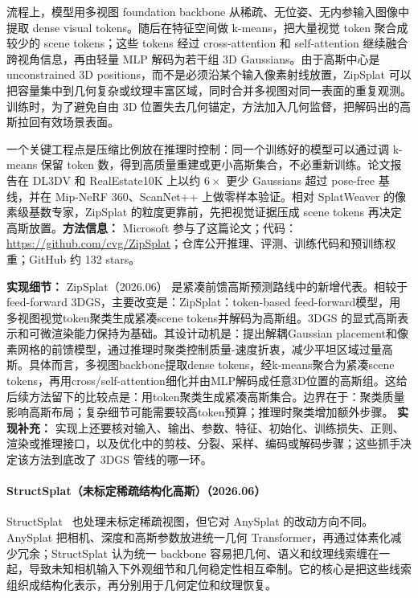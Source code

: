流程上，模型用多视图 foundation backbone 从稀疏、无位姿、无内参输入图像中提取 dense visual tokens。随后在特征空间做 k-means，把大量视觉 token 聚合成较少的 scene tokens；这些 tokens 经过 cross-attention 和 self-attention 继续融合跨视角信息，再由轻量 MLP 解码为若干组 3D Gaussians。由于高斯中心是 unconstrained 3D positions，而不是必须沿某个输入像素射线放置，ZipSplat 可以把容量集中到几何复杂或纹理丰富区域，同时合并多视图对同一表面的重复观测。训练时，为了避免自由 3D 位置失去几何锚定，方法加入几何监督，把解码出的高斯拉回有效场景表面。

一个关键工程点是压缩比例放在推理时控制：同一个训练好的模型可以通过调 k-means 保留 token 数，得到高质量重建或更小高斯集合，不必重新训练。论文报告在 DL3DV 和 RealEstate10K 上以约 $6\times$ 更少 Gaussians 超过 pose-free 基线，并在 Mip-NeRF 360、ScanNet++ 上做零样本验证。相对 SplatWeaver 的像素级基数专家，ZipSplat 的粒度更靠前，先把视觉证据压成 scene tokens 再决定高斯放置。\textbf{方法信息：} Microsoft 参与了这篇论文；代码：\url{https://github.com/cvg/ZipSplat}；仓库公开推理、评测、训练代码和预训练权重；GitHub 约 132 stars。

\textbf{实现细节：} ZipSplat（2026.06） 是紧凑前馈高斯预测路线中的新增代表。相较于 feed-forward 3DGS，主要改变是：ZipSplat：token-based feed-forward模型，用多视图视觉token聚类生成紧凑scene tokens并解码为高斯组。3DGS 的显式高斯表示和可微渲染能力保持为基础。其设计动机是：提出解耦Gaussian placement和像素网格的前馈模型，通过推理时聚类控制质量-速度折衷，减少平坦区域过量高斯。具体而言，多视图backbone提取dense tokens，经k-means聚合为紧凑scene tokens，再用cross/self-attention细化并由MLP解码成任意3D位置的高斯组。这给后续方法留下的比较点是：用token聚类生成紧凑高斯集合。边界在于：聚类质量影响高斯布局；复杂细节可能需要较高token预算；推理时聚类增加额外步骤。
\textbf{实现补充：} 实现上还要核对输入、输出、参数、特征、初始化、训练损失、正则、渲染或推理接口，以及优化中的剪枝、分裂、采样、编码或解码步骤；这些抓手决定该方法到底改了 3DGS 管线的哪一环。
\paragraph{StructSplat（未标定稀疏结构化高斯）（2026.06）}
StructSplat~\cite{2606_28321} 也处理未标定稀疏视图，但它对 AnySplat 的改动方向不同。AnySplat 把相机、深度和高斯参数放进统一几何 Transformer，再通过体素化减少冗余；StructSplat 认为统一 backbone 容易把几何、语义和纹理线索缠在一起，导致未知相机输入下外观细节和几何稳定性相互牵制。它的核心是把这些线索组织成结构化表示，再分别用于几何定位和纹理恢复。

